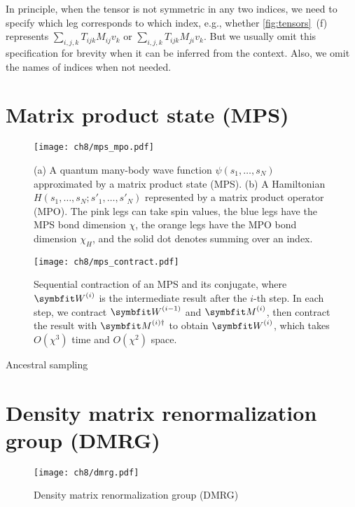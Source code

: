 In principle, when the tensor is not symmetric in any two indices, we need to specify which leg corresponds to which index, e.g., whether \cref{fig:tensors}~(f) represents $\sum_{i, j, k} T_{i j k} M_{i j} v_k$ or $\sum_{i, j, k} T_{i j k} M_{j i} v_k$. But we usually omit this specification for brevity when it can be inferred from the context. Also, we omit the names of indices when not needed.

\section{Matrix product state (MPS)}

\begin{figure}[htb]
\centering
\texttt{[image: ch8/mps\_mpo.pdf]}
\caption[Matrix product state (MPS) and matrix product operator (MPO)]{
(a) A quantum many-body wave function $\psi(s_1, \ldots, s_N)$ approximated by a matrix product state (MPS).
(b) A Hamiltonian $H(s_1, \ldots, s_N; s'_1, \ldots, s'_N)$ represented by a matrix product operator (MPO).
The pink legs can take spin values, the blue legs have the MPS bond dimension $\chi$, the orange legs have the MPO bond dimension $\chi_H$, and the solid dot denotes summing over an index.
}
\label{fig:mps-mpo}
\end{figure}

\begin{figure}[htb]
\centering
\texttt{[image: ch8/mps\_contract.pdf]} \hspace{2cm}
\caption[Sequential contraction of MPS]{
Sequential contraction of an MPS and its conjugate, where $\mW^{(i)}$ is the intermediate result after the $i$-th step. In each step, we contract $\mW^{(i - 1)}$ and $\mM^{(i)}$, then contract the result with $\mM^{(i) \dagger}$ to obtain $\mW^{(i)}$, which takes $O(\chi^3)$ time and $O(\chi^2)$ space.
}
\label{fig:mps-contract}
\end{figure}

Ancestral sampling~\cite{wei2022sequential}

\section{Density matrix renormalization group (DMRG)}

\begin{figure}[htb]
\centering
\texttt{[image: ch8/dmrg.pdf]}
\caption[Density matrix renormalization group (DMRG)]{
Density matrix renormalization group (DMRG)
}
\label{fig:dmrg}
\end{figure}

